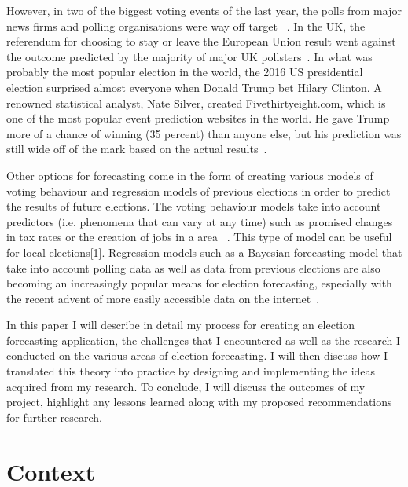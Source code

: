 However, in two of the biggest voting events of the last year, the polls from major news firms and polling organisations were way off target ~\cite{ukbusinsider}.
In the UK, the referendum for choosing to stay or leave the European Union result went against the outcome predicted by the majority of major UK pollsters~\cite{bbcnews}.
In what was probably the most popular election in the world, the 2016 US presidential election surprised almost everyone when Donald Trump bet Hilary Clinton. A renowned statistical analyst, Nate Silver, created Fivethirtyeight.com, which is one of the most popular event prediction websites in the world. He gave Trump more of a chance of winning (35 percent) than anyone else, but his prediction was still wide off of the mark based on the actual results~\cite{natesilver}.

Other options for forecasting come in the form of creating various models of voting behaviour and regression models of previous elections in order to predict the results of future elections. The voting behaviour models take into account predictors (i.e. phenomena that can vary at any time) such as promised changes in tax rates or the creation of jobs in a area ~\cite{stegmaier}. This type of model can be useful for local elections[1]. Regression models such as a Bayesian forecasting model that take into account polling data as well as data from previous elections are also becoming an increasingly popular means for election forecasting, especially with the recent advent of more easily accessible data on the internet~\cite{rigdon}.

In this paper I will describe in detail my process for creating an election forecasting application, the challenges that I encountered as well as the research I conducted on the various areas of election forecasting.  I will then discuss how I translated this theory into practice by designing and implementing the ideas acquired from my research. To conclude, I will discuss the outcomes of my project, highlight any lessons learned along with my proposed recommendations for further research.

\chapter{Context}

